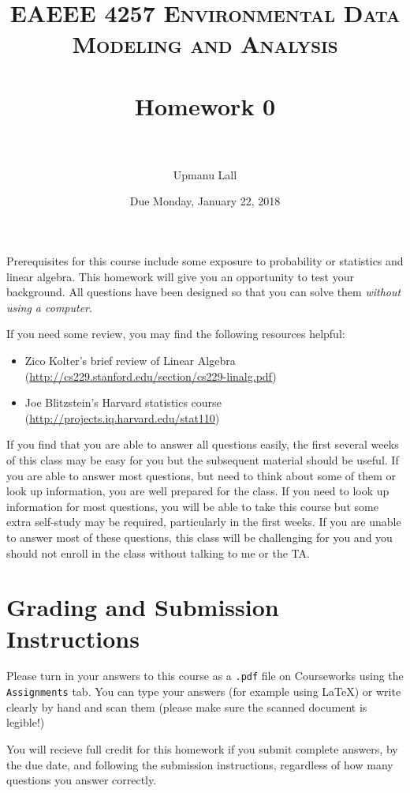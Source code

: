 \documentclass[paper=letter, fontsize=11pt]{scrartcl}
\title{
\normalfont \normalsize
\textsc{EAEEE 4257 Environmental Data Modeling and Analysis} \\ [25pt] %
\horrule{0.5pt} \\[0.4cm] %
\huge Homework 0 \\ %
\horrule{2pt} \\[0.5cm] %
}
\author{Upmanu Lall} %
\date{\normalsize Due Monday, January 22, 2018} %
\numberwithin{equation}{section}
\numberwithin{figure}{section}
\numberwithin{table}{section}
\begin{document}
\maketitle %


Prerequisites for this course include some exposure to probability or statistics and linear algebra.
This homework will give you an opportunity to test your background.
All questions have been designed so that you can solve them \emph{without using a computer}.

If you need some review, you may find the following resources helpful:
\begin{itemize}
  \item Zico Kolter's brief review of Linear Algebra (\url{http://cs229.stanford.edu/section/cs229-linalg.pdf})
  \item Joe Blitzstein's Harvard statistics course (\url{http://projects.iq.harvard.edu/stat110})
\end{itemize}

If you find that you are able to answer all questions easily, the first several weeks of this class may be easy for you but the subsequent material should be useful.
If you are able to answer most questions, but need to think about some of them or look up information, you are well prepared for the class.
If you need to look up information for most questions, you will be able to take this course but some extra self-study may be required, particularly in the first weeks.
If you are unable to answer most of these questions, this class will be challenging for you and you should not enroll in the class without talking to me or the TA.

\section*{Grading and Submission Instructions}

Please turn in your answers to this course as a \texttt{.pdf} file on Courseworks using the \texttt{Assignments} tab.
You can type your answers (for example using \LaTeX) or write clearly by hand and scan them (please make sure the scanned document is legible!)

You will recieve full credit for this homework if you submit complete answers, by the due date, and following the submission instructions, regardless of how many questions you answer correctly.
\end{document}
